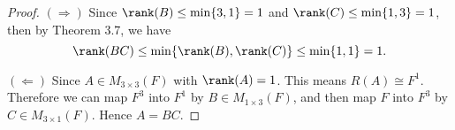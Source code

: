 \begin{Exercise}
	\begin{proof}
		$(\Longrightarrow)$
		Since $\rank(B)\leq \min\{3,1\} = 1$ and $\rank(C)\leq \min\{1,3\} = 1$, then by Theorem 3.7, we have 
		$$
		\rank(BC)\leq \min\{\rank(B), \rank(C)\} \leq \min\{1,1\} = 1.
		$$
		
		\vspace{2ex}
		
		$(\Longleftarrow)$
		Since $A\in M_{3\times 3}(F)$ with $\rank(A) = 1$. This means $R(A)\cong F^1$. Therefore we can map $F^3$ into $F^1$ by $B\in M_{1\times 3}(F)$, and then map $F$ into $F^3$ by $C\in M_{3\times 1}(F)$. Hence $A=BC$.
	\end{proof}
\end{Exercise}